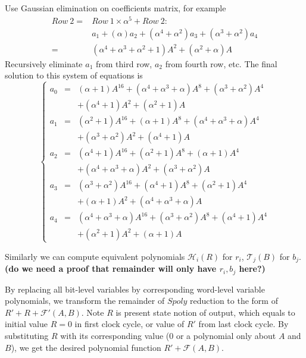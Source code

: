 \begin{Example}
Use Gaussian elimination on coefficients matrix, for example  
\begin{align}
Row\ 2 =& Row\ 1\times \alpha^5 + Row\ 2: \nonumber\\
&a_1+(\alpha)a_2+(\alpha^4+\alpha^2)a_3+(\alpha^3+\alpha^2)a_4\nonumber\\
=&(\alpha^4+\alpha^3+\alpha^2+1)A^2+(\alpha^2+\alpha)A\nonumber
\end{align}
Recursively eliminate $a_1$ from third row, $a_2$ from fourth row, etc. The final solution to this system of
equations is
\begin{displaymath}
\left\{
  \begin{array}{lcl}
  a_0 & = & (\alpha+1)A^{16}+(\alpha^4+\alpha^3+\alpha)A^8+(\alpha^3+\alpha^2)A^4\\&&+(\alpha^4+1)A^2+(\alpha^2+1)A\\
  a_1 & = & (\alpha^2+1)A^{16}+(\alpha+1)A^8+(\alpha^4+\alpha^3+\alpha)A^4\\&&+(\alpha^3+\alpha^2)A^2+(\alpha^4+1)A\\
  a_2 & = & (\alpha^4+1)A^{16}+(\alpha^2+1)A^8+(\alpha+1)A^4\\&&+(\alpha^4+\alpha^3+\alpha)A^2+(\alpha^3+\alpha^2)A\\
  a_3 & = & (\alpha^3+\alpha^2)A^{16}+(\alpha^4+1)A^8+(\alpha^2+1)A^4\\&&+(\alpha+1)A^2+(\alpha^4+\alpha^3+\alpha)A\\
  a_4 & = & (\alpha^4+\alpha^3+\alpha)A^{16}+(\alpha^3+\alpha^2)A^8+(\alpha^4+1)A^4\\&&+(\alpha^2+1)A^2+(\alpha+1)A
  \end{array} \right.
\end{displaymath}
\end{Example}
Similarly we can compute equivalent polynomials $\mathcal{H}_i(R)$ for $r_i$, $\mathcal{T}_j(B)$ for $b_j$.
\textbf{(do we need a proof that remainder will only have $r_i,b_j$ here?)}

By replacing all bit-level variables by corresponding word-level variable polynomials, we transform the remainder
of $Spoly$ reduction to the form of $R'+R+\mathcal F'(A,B)$. Note $R$ is present state notion of output, which
equals to initial value $R=0$ in first clock cycle, or value of $R'$ from last clock cycle. By substituting
$R$ with its corresponding value ($0$ or a polynomial only about $A$ and $B$), we get the desired polynomial function
$R'+\mathcal F(A,B)$.
